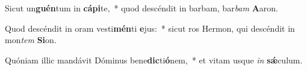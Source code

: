 \item Sicut un\textbf{guén}tum in \textbf{cá}\textbf{pi}te,~* quod descéndit in barbam, bar\textit{bam} \textbf{A}aron.
\item Quod descéndit in oram vesti\textbf{mén}ti \textbf{e}jus:~* sicut ros Hermon, qui descéndit in mon\textit{tem} \textbf{Si}on.
\item Quóniam illic mandávit Dóminus bene\textbf{dic}ti\textbf{ó}nem,~* et vitam usque \textit{in} \textbf{sǽ}culum.
